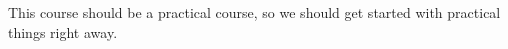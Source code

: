 %
%
This course should be a practical course, so we should get started with practical things right away.
%
%
%
%
\endhsection%
%
